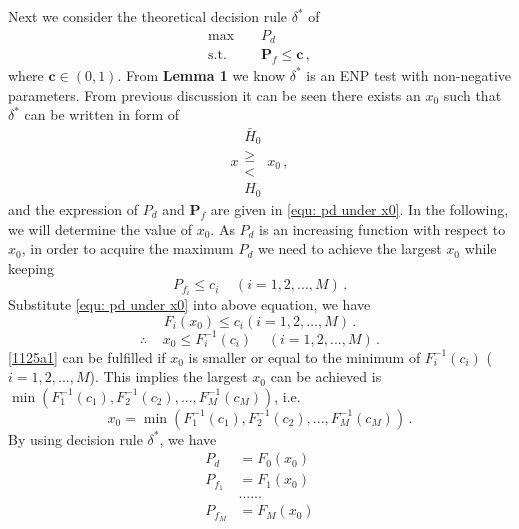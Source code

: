 Next we consider the theoretical decision rule $\delta^\ast$ of
\begin{equation}
\begin{split}
\max\;\;\;\; &P_d\\
\text{s.t.}\;\;\;\;&\mathbf{P}_f \leq \mathbf{c}\,,
\end{split}
\end{equation}
where $\mathbf{c} \in (0, 1)$.
From \textbf{Lemma 1} we know $\delta^\ast$ is an ENP test with non-negative parameters. From previous discussion it can be seen there exists an $x_0$ such that $\delta^\ast$ can be written in form of 
\begin{equation}
\label{1124a1}
x\substack{\bar{H}_0 \\\geq\\< \\H_0}x_0\,,
\end{equation}
and the expression of $P_d$ and $\mathbf{P}_f$ are given in \eqref{equ: pd under x0}. 
In the following, we will determine the value of $x_0$. 
As $P_d$ is an increasing function with respect to $x_0$, in order to acquire the maximum $P_d$ we need to achieve the largest $x_0$ while keeping 
\begin{equation}
P_{f_i} \leq c_i\;\;\;\;(i = 1, 2, ..., M)\,.
\end{equation}
Substitute \eqref{equ: pd under x0} into above equation, we have
\begin{equation}
F_i(x_0) \leq c_i (i=1, 2, ..., M)\,.
\end{equation}
\begin{equation}
\label{1125a1}
\therefore\;\;\;\; x_0 \leq F^{-1}_{i}(c_i) \;\;\;\;(i=1, 2, ..., M)\,.
\end{equation}
\eqref{1125a1} can be fulfilled if $x_0$ is 
 smaller or equal to the minimum of $F^{-1}_{i}(c_i)$ ($i=1, 2, ..., M$). This implies the largest $x_0$ can be achieved is $\min(F_1^{-1}(c_1), F_2^{-1}(c_2), ..., F_M^{-1}(c_M))$, i.e.
\begin{equation}
x_0 = \min(F_1^{-1}(c_1), F_2^{-1}(c_2), ..., F_M^{-1}(c_M))\,.
\end{equation}
By using decision rule $\delta^\ast$, we have
\begin{equation}
\begin{split}
\label{equ: pd under x00}
P_d &=  F_0(x_0)\\
P_{f_1} &=  F_1(x_0)\\
  &......\\
P_{f_M} &= F_M(x_0)
\end{split}
\end{equation}
\typeout{}


\typeout{}

